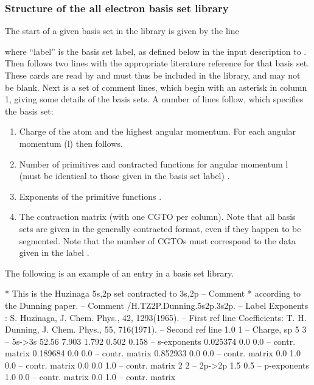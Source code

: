 \subsubsection{Structure of the all electron basis set library}
\label{UG:sec:structure_of_the_ae_basis_set_libraries}
 
The start of a given basis set in the library is given by the line


where ``label'' is the basis set label, as defined below in the input
description to
. Then follows two lines with the
appropriate literature reference for that basis set. These
cards are read by
and must thus be included in the library, and may not be blank.
Next is a set of comment lines, which begin with an asterisk in column 1,
giving some details of the basis
sets. A number of lines follow, which specifies the basis set:
\begin{enumerate}
\item Charge of the atom and the highest angular momentum.  
For each angular momentum (l) then follows.
\item Number of primitives and contracted functions for angular momentum l
(must be identical to those given in the basis set label) \label{it:ae-2}.
\item Exponents of the primitive functions \label{it:ae-3}.
\item The contraction matrix (with one CGTO per column). Note that all
basis sets are given in the generally contracted format, even if they
happen to be segmented. Note that the number of CGTOs must correspond
to the data given in the label \label{it:ae-4}.
\end{enumerate}

The following is an example of an entry in a basis set library.
\begin{sourcelisting}
* This is the Huzinaga 5s,2p set contracted to 3s,2p        -- Comment   
* according to the Dunning paper.                           -- Comment   
/H.TZ2P.Dunning.5s2p.3s2p.                                  -- Label            
Exponents  : S. Huzinaga, J. Chem. Phys., 42, 1293(1965).   -- First ref line   
Coefficients: T. H. Dunning, J. Chem. Phys., 55, 716(1971). -- Second ref line  
 1.0 1                                                      -- Charge, sp       
 5 3                                                        -- 5s->3s           
 52.56 7.903 1.792 0.502 0.158                              -- s-exponents  	   
 0.025374  0.0  0.0				 	    -- contr. matrix	
 0.189684  0.0  0.0				 	    -- contr. matrix	
 0.852933  0.0  0.0				 	    -- contr. matrix	
 0.0	   1.0  0.0				 	    -- contr. matrix	
 0.0	   0.0  1.0				 	    -- contr. matrix	
 2  2                                                       -- 2p->2p           
 1.5  0.5                                                   -- p-exponents       
 1.0 0.0					            -- contr. matrix    
 0.0 1.0					            -- contr. matrix    
\end{sourcelisting}
